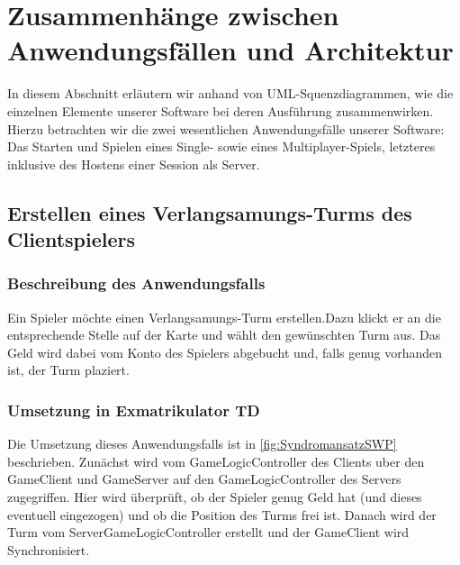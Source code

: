 \documentclass[enabledeprecatedfontcommands,fontsize=12pt,paper=a4,twoside,parskip=half]{scrartcl}
\begin{document}
\clearpage

\section[Zusammenhänge zwischen Anwendungsfällen und Architektur]{Zusammenhänge zwischen Anwendungsfällen und Architektur}
\label{sec:zusammenheange}

In diesem Abschnitt erläutern wir anhand von UML-Squenzdiagrammen, wie die einzelnen Elemente unserer Software bei deren Ausführung zusammenwirken. Hierzu betrachten wir die zwei wesentlichen Anwendungsfälle unserer Software: Das Starten und Spielen eines Single- sowie eines Multiplayer-Spiels, letzteres inklusive des Hostens einer Session als Server. %



\subsection{Erstellen eines Verlangsamungs-Turms des Clientspielers}

\subsubsection{Beschreibung des Anwendungsfalls}

Ein Spieler möchte einen Verlangsamungs-Turm erstellen.Dazu klickt er an die entsprechende Stelle auf der Karte und wählt den gewünschten Turm aus. Das Geld wird dabei vom Konto des Spielers abgebucht und, falls genug vorhanden ist, der Turm plaziert. 

\subsubsection{Umsetzung in Exmatrikulator TD}

Die Umsetzung dieses Anwendungsfalls ist in \autoref{fig:SyndromansatzSWP} beschrieben. Zunächst wird vom GameLogicController des Clients uber den GameClient und GameServer auf den GameLogicController des Servers zugegriffen. Hier wird überprüft, ob der Spieler genug Geld hat (und dieses eventuell eingezogen) und ob die Position des Turms frei ist. Danach wird der Turm vom ServerGameLogicController erstellt und der GameClient wird Synchronisiert.
\end{document}
